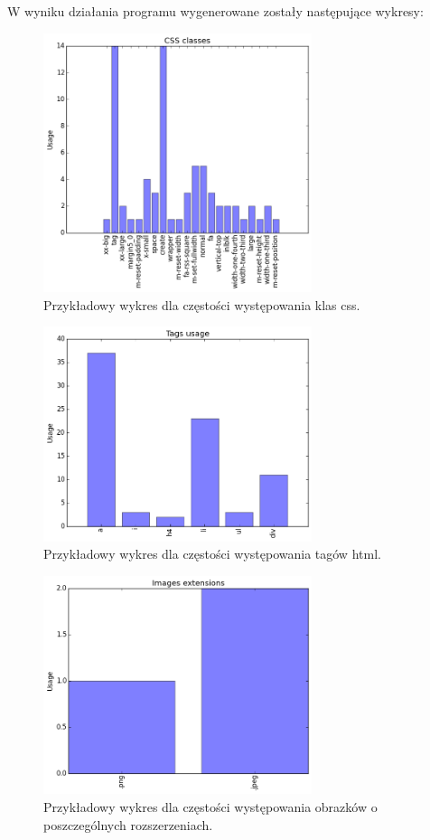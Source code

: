 \documentclass[12pt]{article}
\begin{document}
W wyniku działania programu wygenerowane zostały następujące wykresy:

\begin{figure}[H]
\centering
\caption{Przykładowy wykres dla częstości występowania klas css.}
\label{img:wykresCss}
\includegraphics[width=0.7\textwidth]{WykresCss.png}
\end{figure}

\begin{figure}[H]
\centering
\caption{Przykładowy wykres dla częstości występowania tagów html.}
\label{img:wykresTagi}
\includegraphics[width=0.7\textwidth]{WykresTagi.png}
\end{figure}

\begin{figure}[H]
\centering
\caption{Przykładowy wykres dla częstości występowania obrazków o poszczególnych rozszerzeniach.}
\label{img:wykresObrazki}
\includegraphics[width=0.7\textwidth]{WykresObrazki.png}
\end{figure}
\end{document}
